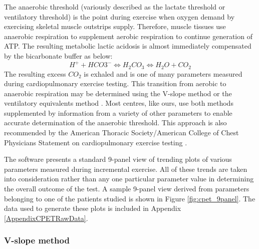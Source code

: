 The anaerobic threshold (variously described as the lactate threshold or ventilatory threshold) is the point during exercise when oxygen demand by exercising skeletal muscle outstrips supply. 
Therefore, muscle tissues use anaerobic respiration to supplement aerobic respiration to continue generation of ATP. 
The resulting metabolic lactic acidosis is almost immediately compensated by the bicarbonate buffer as below: 
\begin{equation} \label{eq:bicarb_buffer}
	H^+ + HCO3^- \Longleftrightarrow H_2CO_3 \Longleftrightarrow H_2O + CO_2
\end{equation}
The resulting excess $CO_2$ is exhaled and is one of many parameters measured during cardiopulmonary exercise testing. 
This transition from aerobic to anaerobic respiration may be determined using the V-slope method \parencite{sue_metabolic_1988} or the ventilatory equivalents method \parencite{beaver_new_1986}. 
Most centres, like ours, use both methods supplemented by information from a variety of other parameters to enable accurate determination of the anaerobic threshold.
This approach is also recommended by the American Thoracic Society/American College of Chest Physicians Statement on cardiopulmonary exercise testing \parencite{society_ats/accp_2003}.

The software presents a standard 9-panel view of trending plots of various parameters measured during incremental exercise. 
All of these trends are taken into consideration rather than any one particular parameter value in determining the overall outcome of the test. 
A sample 9-panel view derived from parameters belonging to one of the patients studied is shown in Figure \ref{fig:cpet_9panel}. 
The data used to generate these plots is included in Appendix \ref{AppendixCPETRawData}. 

\subsubsection{V-slope method}

